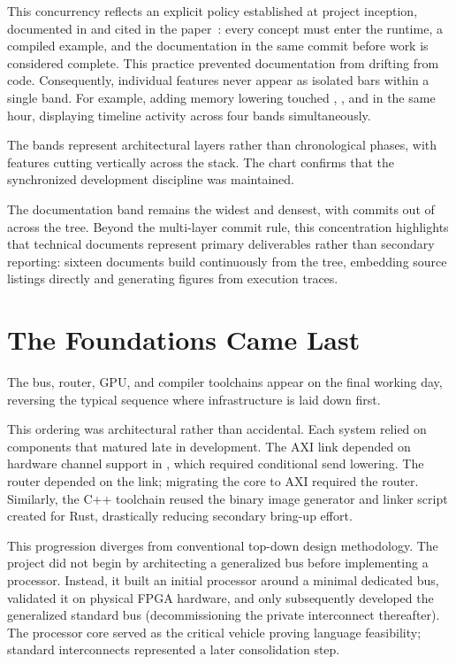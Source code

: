 \documentclass[journal,onecolumn,9pt]{IEEEtran}
\begin{document}
This concurrency reflects an explicit policy established at project
inception, documented in  and cited in the
paper~\cite{paper}: every concept must enter the runtime, a compiled
example, and the documentation in the same commit before work is
considered complete. This practice prevented documentation from
drifting from code. Consequently, individual features never appear as
isolated bars within a single band. For example, adding memory lowering
touched , , and  in the
same hour, displaying timeline activity across four bands simultaneously.

The bands represent architectural layers rather than chronological
phases, with features cutting vertically across the stack. The chart
confirms that the synchronized development discipline was maintained.

The documentation band remains the widest and densest, with
\ganttdocs{} commits out of \ganttcommits{} across the tree. Beyond the
multi-layer commit rule, this concentration highlights that technical
documents represent primary deliverables rather than secondary
reporting: sixteen documents build continuously from the tree, embedding
source listings directly and generating figures from execution traces.

\section{The Foundations Came Last}
\label{sec:d-last}

The bus, router, GPU, and compiler toolchains appear on the final
working day, reversing the typical sequence where infrastructure is
laid down first.

This ordering was architectural rather than accidental. Each system
relied on components that matured late in development. The AXI link
depended on hardware channel support in , which required
conditional send lowering. The router depended on the link; migrating the
core to AXI required the router. Similarly, the C++ toolchain reused the
binary image generator and linker script created for Rust, drastically
reducing secondary bring-up effort.

This progression diverges from conventional top-down design methodology.
The project did not begin by architecting a generalized bus before
implementing a processor. Instead, it built an initial processor around a
minimal dedicated bus, validated it on physical FPGA hardware, and only
subsequently developed the generalized standard bus (decommissioning the
private interconnect thereafter). The processor core served as the
critical vehicle proving language feasibility; standard interconnects
represented a later consolidation step.
\end{document}

